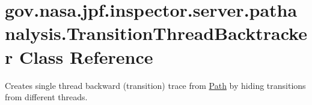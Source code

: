 \hypertarget{classgov_1_1nasa_1_1jpf_1_1inspector_1_1server_1_1pathanalysis_1_1_transition_thread_backtracker}{}\section{gov.\+nasa.\+jpf.\+inspector.\+server.\+pathanalysis.\+Transition\+Thread\+Backtracker Class Reference}
\label{classgov_1_1nasa_1_1jpf_1_1inspector_1_1server_1_1pathanalysis_1_1_transition_thread_backtracker}


Creates single thread backward (transition) trace from \hyperlink{}{Path} by hiding transitions from different threads.  


